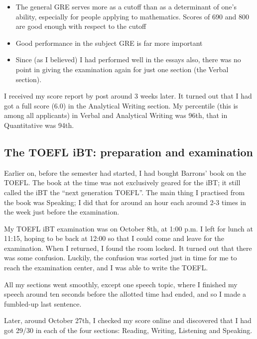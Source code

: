 \documentclass[a4paper]{amsart}
\begin{document}
\begin{itemize}

\item The general GRE serves more as a cutoff than as a determinant of one's
  ability, especially for people applying to mathematics. Scores
  of 690 and 800 are good enough with respect to the cutoff

\item Good performance in the subject GRE is far more important

\item Since (as I believed) I had performed well in the essays also,
  there was no point in giving the examination again for just one section
  (the Verbal section).

\end{itemize}

I received my score report by post around 3 weeks later. It turned out
that I had got a full score (6.0) in the Analytical Writing section.
My percentile (this is among all applicants) in Verbal and Analytical
Writing was 96th, that in Quantitative was 94th.

\subsection{The TOEFL iBT: preparation and examination}

Earlier on, before the semester had started, I had bought
Barrons' book on the TOEFL. The book at the time was not exclusively
geared for the iBT; it still called the iBT the ``next generation TOEFL''.
The main thing I practised from the book was Speaking; I did that
for around an hour each around 2-3 times in the week just before
the examination.

My TOEFL iBT examination was on October 8th, at 1:00 p.m. I left for
lunch at 11:15, hoping to be back at 12:00 so that I could come and
leave for the examination. When I returned, I found the room locked.
It turned out that there was some confusion. Luckily, the confusion
was sorted just in time for me to reach the examination center, and I
was able to write the TOEFL.

All my sections went smoothly, except one speech topic, where I finished
my speech around ten seconds before the allotted time had ended,
and so I made a fumbled-up last sentence.

Later, around October 27th, I checked my score online and discovered
that I had got 29/30 in each of the four sections: Reading, Writing,
Listening and Speaking.
\end{document}
